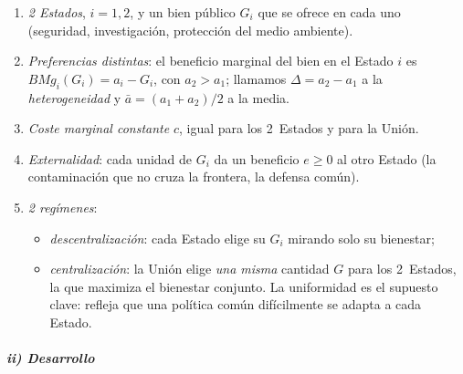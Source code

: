 \documentclass[11pt]{article}
\begin{document}
\begin{enumerate}
\item \emph{2 Estados}, $i=1,2$, y un bien público $G_i$ que se ofrece en cada uno (seguridad, investigación, protección del medio ambiente).
\item \emph{Preferencias distintas}: el beneficio marginal del bien en el Estado $i$ es $\mathit{BMg}_i(G_i)=a_i-G_i$, con $a_2>a_1$; llamamos $\Delta=a_2-a_1$ a la \emph{heterogeneidad} y $\bar a=(a_1+a_2)/2$ a la media.
\item \emph{Coste marginal constante} $c$, igual para los 2~Estados y para la Unión.
\item \emph{Externalidad}: cada unidad de $G_i$ da un beneficio $e\geq0$ al otro Estado (la contaminación que no cruza la frontera, la defensa común).
\item \emph{2 regímenes}:
  \begin{itemize}
  \item \emph{descentralización}: cada Estado elige su $G_i$ mirando solo su bienestar;
  \item \emph{centralización}: la Unión elige \emph{una misma} cantidad $G$ para los 2~Estados, la que maximiza el bienestar conjunto. La uniformidad es el supuesto clave: refleja que una política común difícilmente se adapta a cada Estado.
  \end{itemize}
\end{enumerate}

\subparagraph{ii) Desarrollo}
\end{document}
